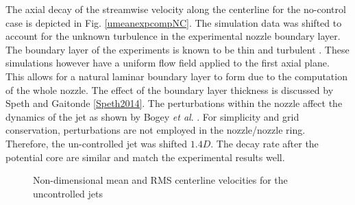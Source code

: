 \documentclass[english]{aiaa-tc}
\begin{document}
The axial decay of the streamwise velocity along the centerline for the no-control case is depicted in Fig. \ref{umeanexpcompNC}. The simulation data was shifted to account for the unknown turbulence in the experimental nozzle boundary layer. 
The boundary layer of the experiments is known to be thin and turbulent \cite{kastnerj2009-1}. These simulations however have a uniform flow field applied to the first axial plane. This allows for a natural laminar boundary layer to form due to the computation of the whole nozzle. The effect of the boundary layer thickness is discussed by Speth and Gaitonde \ref{Speth2014}. The perturbations within the nozzle affect the dynamics of the jet as shown by Bogey {\em et al}. \cite{bogey2012}. 
For simplicity and grid conservation, perturbations are not employed in the nozzle/nozzle ring. Therefore, the  un-controlled jet was shifted $1.4D$.  The decay rate after the potential core are similar and match the experimental results well.
\begin{figure}
\begin{center}
\label{expcompNC}
\caption{Non-dimensional mean and RMS centerline velocities for the uncontrolled jets}
\end{center}
 \end{figure}
\end{document}
